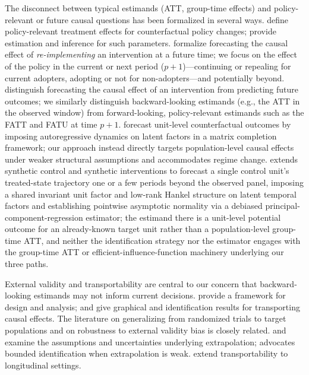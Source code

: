 \documentclass{article}
\begin{document}
The disconnect between typical estimands (ATT, group-time effects) and policy-relevant or future causal questions has been formalized in several ways. \citet{heckmanPolicyRelevantTreatmentEffects2001} define policy-relevant treatment effects for counterfactual policy changes; \citet{sasakiEstimationInferencePolicy2023} provide estimation and inference for such parameters. \citet{forastiereForecastingCausalEffects2025} formalize forecasting the causal effect of \emph{re-implementing} an intervention at a future time; we focus on the effect of the policy in the current or next period ($p+1$)---continuing or repealing for current adopters, adopting or not for non-adopters---and potentially beyond. \citet{gischeForecastingCausalEffects2021} distinguish forecasting the causal effect of an intervention from predicting future outcomes; we similarly distinguish backward-looking estimands (e.g., the ATT in the observed window) from forward-looking, policy-relevant estimands such as the FATT and FATU at time $p+1$. \citet{debCounterfactualForecastingPanel2026} forecast unit-level counterfactual outcomes by imposing autoregressive dynamics on latent factors in a matrix completion framework; our approach instead directly targets population-level causal effects under weaker structural assumptions and accommodates regime change. \citet{shenControlTreatmentCausal2026} extends synthetic control and synthetic interventions to forecast a single control unit's treated-state trajectory one or a few periods beyond the observed panel, imposing a shared invariant unit factor and low-rank Hankel structure on latent temporal factors and establishing pointwise asymptotic normality via a debiased principal-component-regression estimator; the estimand there is a unit-level potential outcome for an already-known target unit rather than a population-level group-time ATT, and neither the identification strategy nor the estimator engages with the group-time ATT or efficient-influence-function machinery underlying our three paths.

External validity and transportability are central to our concern that backward-looking estimands may not inform current decisions. \citet{egamiElementsExternalValidity2023} provide a framework for design and analysis; \citet{pearlExternalValidityCalculus2022} and \citet{bareinboimTransportabilityCausalEffects2012} give graphical and identification results for transporting causal effects. The literature on generalizing from randomized trials to target populations \citep{coleGeneralizingEvidenceRandomized2010,tiptonImprovingGeneralizationsExperiments2013} and on robustness to external validity bias \citep{devauxQuantifyingRobustnessExternal2022} is closely related. \citet{khosrowiExtrapolationCausalEffects2019} and \citet{khosrowiExtrapolatingExperimentsConfidently2023} examine the assumptions and uncertainties underlying extrapolation; \citet{manskiPublicPolicyUncertain2013} advocates bounded identification when extrapolation is weak. \citet{shpitserCounterfactualGraphicalModels2013} extend transportability to longitudinal settings.
\end{document}
